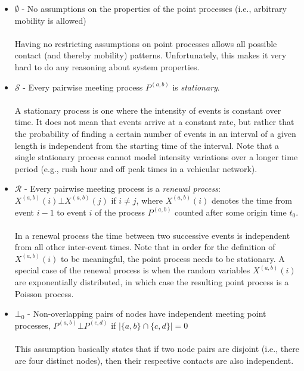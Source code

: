\documentclass{article}
\begin{document}
\begin{itemize}
\item $\emptyset$ - No assumptions on the properties of the point processes (i.e., arbitrary mobility is allowed)\\
\\
Having no restricting assumptions on point processes allows all
possible contact (and thereby mobility) patterns. Unfortunately, this
makes it very hard to do any reasoning about system properties.

\item $\mathcal{S}$ - Every pairwise meeting process $P^{(a,b)}$ is
  \emph{stationary}.\\
  \\
  A stationary process is one where the intensity of events is
  constant over time. It does not mean that events arrive at a
  constant rate, but rather that the probability of finding a certain
  number of events in an interval of a given length is independent
  from the starting time of the interval. Note that a single stationary
  process cannot model intensity variations over a longer time period
  (e.g., rush hour and off peak times in a vehicular network). 

\item $\mathcal{R}$ - Every pairwise meeting process is a
  \emph{renewal process}: $X^{(a,b)}(i) \bot X^{(a,b)}(j)$ if $i \neq
  j$, where $X^{(a,b)}(i)$ denotes the time from event $i-1$ to event
  $i$ of the process $P^{(a,b)}$ counted after some origin time $t_0$.\\
\\
In a renewal process the time between two successive events is
independent from all other inter-event times. Note that in order for
the definition of $X^{(a,b)}(i)$ to be meaningful, the point
process needs to be stationary. A special case of the renewal process
is when the random variables $X^{(a,b)}(i)$ are exponentially
distributed, in which case the resulting point process is a Poisson
process.

\item $\bot_0$ - Non-overlapping pairs of nodes have independent meeting point processes, $P^{(a,b)} \bot P^{(c,d)}$ if $|\{a,b\} \cap \{c,d\}| = 0$\\
  \\
  This assumption basically states that if two node pairs are disjoint
  (i.e., there are four distinct nodes), then their respective
  contacts are also independent.


\end{itemize}
\end{document}
